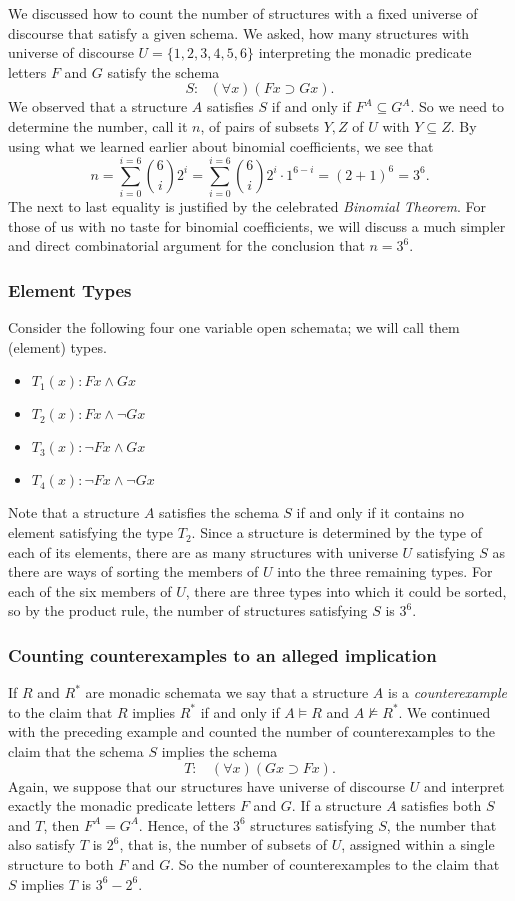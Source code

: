 We discussed how to count the number of structures with a fixed universe of discourse that satisfy a given schema. We asked, how many structures with universe of discourse $U=\{1,2,3,4,5,6\}$ interpreting the monadic predicate letters $F$ and $G$ satisfy the schema 
\[S:\ \ \ (\forall x)(Fx\supset Gx).\] 
We observed that a structure $A$ satisfies $S$ if and only if $F^A\subseteq G^A$. So we need to determine the number, call it $n$, of pairs of subsets $Y,Z$ of $U$ with $Y\subseteq Z$. By using what we learned earlier about binomial coefficients, we see that 
\[n=\sum_{i=0}^{i=6}\binom{6}{i}2^i = \sum_{i=0}^{i=6}\binom{6}{i}2^i\cdot 1^{6-i}=(2+1)^6 = 3^6.\]
The next to last equality is justified by the celebrated \emph{Binomial Theorem}. For those of us with no taste for binomial coefficients, we will discuss a much simpler and direct combinatorial argument for the conclusion that $n= 3^6$.
\subsubsection{Element Types}

Consider the following four one variable open schemata; we will call them (element) types.
\begin{itemize}
\item $T_1(x): Fx\wedge Gx$
\item $T_2(x): Fx\wedge \neg Gx$
\item $T_3(x): \neg Fx\wedge Gx$
\item $T_4(x): \neg Fx\wedge \neg Gx$
\end{itemize}
Note that a structure $A$ satisfies the schema $S$ if and only if it contains no element satisfying the type $T_2$. Since a structure is determined by the type of each of its elements, there are as many structures with universe $U$ satisfying $S$ as there are ways of sorting the members of $U$ into the three remaining types. For each of the six members of $U$, there are three types into which it could be sorted, so by the product rule, the number of structures satisfying $S$ is $3^6$.
\subsubsection{Counting counterexamples to an alleged implication}
If $R$ and $R^*$ are monadic schemata we say that a structure $A$ is a \emph{counterexample} to the claim that $R$ implies $R^*$ if and only if $A\models R$ and $A\not\models R^*$. We continued with the preceding example and counted the number of counterexamples to the claim that the schema $S$ implies the schema
\[T:\ \ \ \ (\forall x)(Gx\supset Fx).\]
Again, we suppose that our structures have universe of discourse $U$ and interpret exactly the monadic predicate letters $F$ and $G$. If a structure $A$ satisfies both $S$ and $T$, then $F^A=G^A$. Hence, of the $3^6$ structures satisfying $S$, the number that also satisfy $T$ is $2^6$, that is, the number of subsets of $U$, assigned within a single structure to both $F$ and $G$. So the number of counterexamples to the claim that $S$ implies $T$ is $3^6 - 2^6$.  

